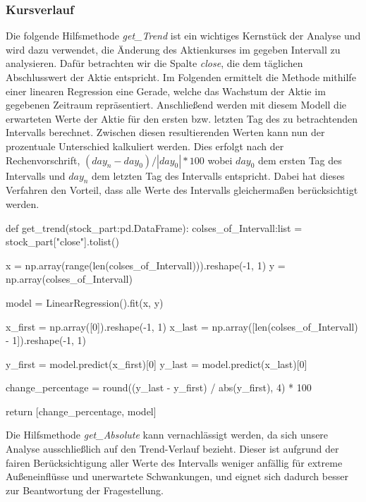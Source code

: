 \documentclass{article}
\begin{document}
\subsubsection{Kursverlauf} \label{Kursverlauf}
Die folgende Hilfsmethode \textit{get\_Trend} ist ein wichtiges Kernstück der Analyse und wird dazu verwendet, die Änderung des Aktienkurses im gegeben Intervall zu analysieren.
Dafür betrachten wir die Spalte \textit{close}, die dem täglichen Abschlusswert der Aktie entspricht.
Im Folgenden ermittelt die Methode mithilfe einer linearen Regression eine Gerade, welche das Wachstum der Aktie im gegebenen Zeitraum repräsentiert.
Anschließend werden mit diesem Modell die erwarteten Werte der Aktie für den ersten bzw. letzten Tag des zu betrachtenden Intervalls berechnet.
Zwischen diesen resultierenden Werten kann nun der prozentuale Unterschied kalkuliert werden.
Dies erfolgt nach der Rechenvorschrift, $ (day_{n} - day_{0}) / |day_{0}| * 100 $ wobei $day_{0}$ dem ersten Tag des Intervalls und $day_{n}$ dem letzten Tag des Intervalls entspricht. 
Dabei hat dieses Verfahren den Vorteil, dass alle Werte des Intervalls gleichermaßen berücksichtigt werden.

\begin{python}
def get_trend(stock_part:pd.DataFrame):
    colses_of_Intervall:list = stock_part["close"].tolist()
    
    x = np.array(range(len(colses_of_Intervall))).reshape(-1, 1)
    y = np.array(colses_of_Intervall)

    model = LinearRegression().fit(x, y)

    x_first = np.array([0]).reshape(-1, 1)
    x_last = np.array([len(colses_of_Intervall) - 1]).reshape(-1, 1)

    y_first = model.predict(x_first)[0]
    y_last = model.predict(x_last)[0]

    change_percentage = round((y_last - y_first) / abs(y_first), 4) * 100

    return [change_percentage, model]
\end{python}
Die Hilfsmethode \textit{get\_Absolute} kann vernachlässigt werden, da sich unsere Analyse ausschließlich auf den Trend-Verlauf bezieht.
Dieser ist aufgrund der fairen Berücksichtigung aller Werte des Intervalls weniger anfällig für extreme Außeneinflüsse und unerwartete Schwankungen, und eignet sich dadurch besser zur Beantwortung der Fragestellung.
\end{document}
